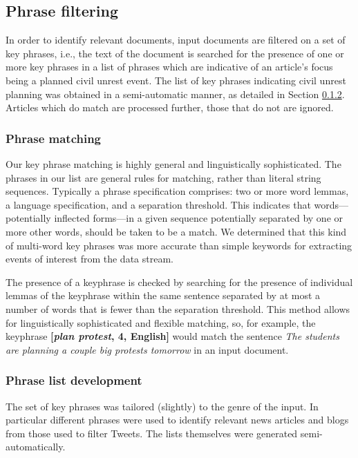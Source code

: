 \vspace{-0.5em}
\subsection{Phrase filtering}
In order to identify relevant documents, input documents are filtered on a set of key phrases, i.e.,
the text of the document is searched for the presence of one or
more key phrases in a list of phrases which are indicative of an article's focus being
a planned civil unrest event.  
The list of key phrases indicating civil unrest planning was obtained
in a semi-automatic manner, as detailed in Section \ref{sec:phraselearning}.
Articles which do match are processed further, those that do not are ignored.

\subsubsection{Phrase matching}
Our key phrase matching is highly general and linguistically
sophisticated.  The phrases in our list are general rules for
matching, rather than literal string sequences. Typically a phrase
specification comprises: two or more word lemmas, a language
specification, and a separation threshold. This indicates that words---potentially inflected forms---in 
a given sequence potentially separated by one or more other words, should be taken to be a
match. We determined that this kind of
multi-word key phrases was more accurate than simple keywords for
extracting events of interest from the data stream.

The presence of a keyphrase is checked by searching for the presence of
individual lemmas of the keyphrase within the same sentence separated
by at most a number of words that is fewer than the separation threshold.  
This method allows for linguistically sophisticated and flexible matching, so, for example,
the keyphrase {\bf [{\em plan protest}, 4, English]} would match the sentence
{\em The students are planning a couple big protests tomorrow} in an input document.

\subsubsection{Phrase list development}
\label{sec:phraselearning}
The set of key phrases was tailored (slightly) to the genre of the
input. In particular different phrases were used to identify relevant
news articles and blogs from those used to filter Tweets.  The lists
themselves were generated semi-automatically.

